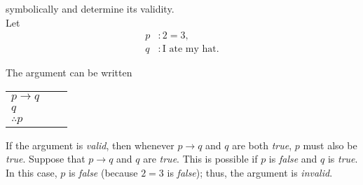symbolically and determine its validity.\\

Let
\begin{align*}
    p&: 2 = 3,\\
    q&: \text{I ate my hat}.
\end{align*}

The argument can be written

\begin{table}[h]
\centering
\begin{tabular}{l@{\,}l@{\,}l@{\,}}
$p \rightarrow q$ & & \\
$q$ & & \\
\hline
$\therefore p$ & &
\end{tabular}
\end{table}

If the argument is \textit{valid}, then whenever $p \rightarrow q$ and $q$ are both \textit{true}, $p$ must also be \textit{true}.  Suppose that $p \rightarrow q$ and $q$ are \textit{true}.  This is possible if $p$ is \textit{false} and $q$ is \textit{true}.  In this case, $p$ is \textit{false} (because $2 = 3$ is \textit{false}); thus, the argument is \textit{invalid}.
